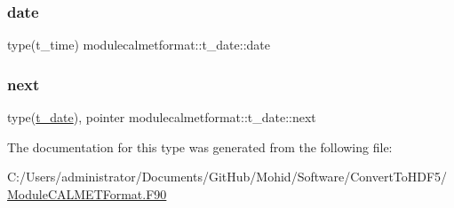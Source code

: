 \subsubsection{\texorpdfstring{date}{date}}
{\footnotesize\ttfamily type(t\+\_\+time) modulecalmetformat\+::t\+\_\+date\+::date\hspace{0.3cm}{\ttfamily [private]}}

\mbox{\label{structmodulecalmetformat_1_1t__date_a8d919a034cc3b449d05cd32766ec1810}} 
\subsubsection{\texorpdfstring{next}{next}}
{\footnotesize\ttfamily type(\mbox{\hyperlink{structmodulecalmetformat_1_1t__date}{t\+\_\+date}}), pointer modulecalmetformat\+::t\+\_\+date\+::next\hspace{0.3cm}{\ttfamily [private]}}



The documentation for this type was generated from the following file\+:\begin{DoxyCompactItemize}
\item 
C\+:/\+Users/administrator/\+Documents/\+Git\+Hub/\+Mohid/\+Software/\+Convert\+To\+H\+D\+F5/\mbox{\hyperlink{_module_c_a_l_m_e_t_format_8_f90}{Module\+C\+A\+L\+M\+E\+T\+Format.\+F90}}\end{DoxyCompactItemize}
